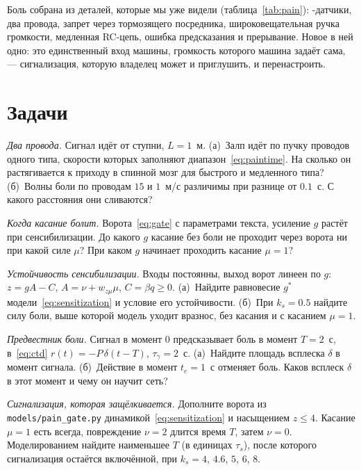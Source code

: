 Боль собрана из деталей, которые мы уже видели (таблица~\ref{tab:pain}): -датчики, два провода, запрет через тормозящего посредника, широковещательная ручка громкости, медленная RC-цепь, ошибка предсказания и прерывание. Новое в ней одно: это единственный вход машины, громкость которого машина задаёт сама, --- сигнализация, которую владелец может и приглушить, и перенастроить.

\section{Задачи}

\begin{exercise}[\lvlA]
\label{ex:14:1}
\emph{Два провода.} Сигнал идёт от ступни, $L=1$~м. (а)~Залп идёт по пучку проводов одного типа, скорости которых заполняют диапазон~\eqref{eq:paintime}. На сколько он растягивается к приходу в спинной мозг для быстрого и медленного типа? (б)~Волны боли по проводам $15$ и $1$~м/с различимы при разнице от $0.1$~с. С какого расстояния они сливаются?
\end{exercise}

\begin{exercise}[\lvlB]
\label{ex:14:2}
\emph{Когда касание болит.} Ворота~\eqref{eq:gate} с параметрами текста, усиление $g$ растёт при сенсибилизации. До какого $g$ касание без боли не проходит через ворота ни при какой силе $\mu$? При каком $g$ начинает проходить касание $\mu=1$?
\end{exercise}

\begin{exercise}[\lvlB]
\label{ex:14:3}
\emph{Устойчивость сенсибилизации.} Входы постоянны, выход ворот линеен по $g$: $z=gA-C$, $A=\nu+w_{z\mu}\mu$, $C=\beta q\ge0$. (а)~Найдите равновесие $g^*$ модели~\eqref{eq:sensitization} и условие его устойчивости. (б)~При $k_s=0.5$ найдите силу боли, выше которой модель уходит вразнос, без касания и с касанием $\mu=1$.
\end{exercise}

\begin{exercise}[\lvlA]
\label{ex:14:4}
\emph{Предвестник боли.} Сигнал в момент $0$ предсказывает боль в момент $T=2$~с, в~\eqref{eq:ctd} $r(t)=-P\,\delta(t-T)$, $\tau_\gamma=2$~с. (а)~Найдите площадь всплеска $\delta$ в момент сигнала. (б)~Действие в момент $t_e=1$~с отменяет боль. Каков всплеск $\delta$ в этот момент и чему он научит сеть?
\end{exercise}

\begin{exercise}[\lvlB]
\label{ex:14:5}
\emph{Сигнализация, которая защёлкивается.} Дополните ворота из \texttt{models/\allowbreak pain\_gate.py} динамикой~\eqref{eq:sensitization} и насыщением $z\le4$. Касание $\mu=1$ есть всегда, повреждение $\nu=2$ длится время $T$, затем $\nu=0$. Моделированием найдите наименьшее $T$ (в единицах $\tau_s$), после которого сигнализация остаётся включённой, при $k_s=4$, $4.6$, $5$, $6$, $8$.
\end{exercise}

